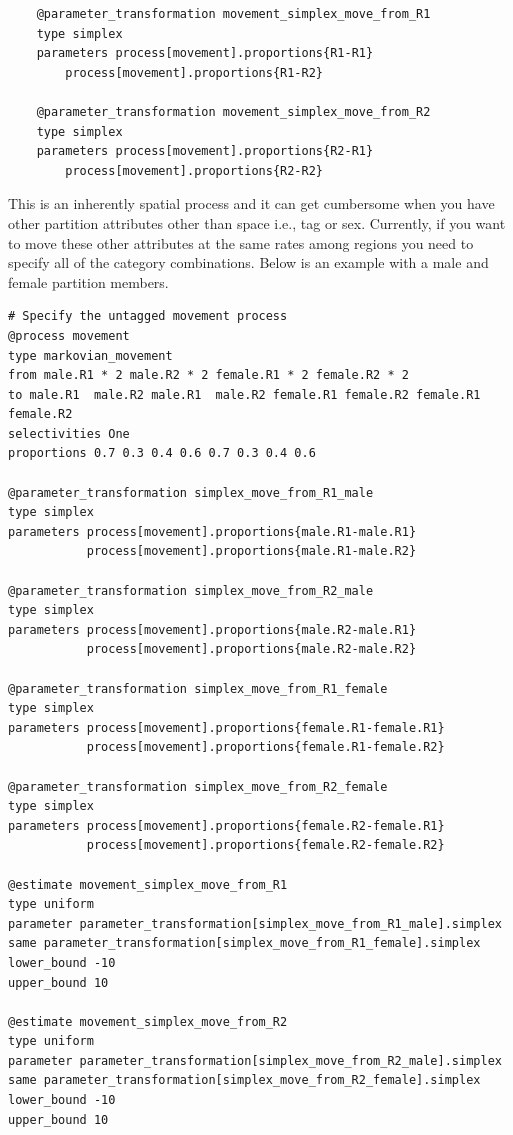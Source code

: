 {\small{\begin{verbatim}
	@parameter_transformation movement_simplex_move_from_R1
	type simplex
	parameters process[movement].proportions{R1-R1} 
		process[movement].proportions{R1-R2}
	
	@parameter_transformation movement_simplex_move_from_R2
	type simplex
	parameters process[movement].proportions{R2-R1} 
		process[movement].proportions{R2-R2}			
\end{verbatim}}}

This is an inherently spatial process and it can get cumbersome when you have other partition attributes other than space i.e., tag or sex. Currently, if you want to move these other attributes at the same rates among regions you need to specify all of the category combinations. Below is an example with a male and female partition members.

{\small{\begin{verbatim}
# Specify the untagged movement process
@process movement
type markovian_movement
from male.R1 * 2 male.R2 * 2 female.R1 * 2 female.R2 * 2
to male.R1  male.R2 male.R1  male.R2 female.R1 female.R2 female.R1  female.R2
selectivities One
proportions 0.7 0.3 0.4 0.6 0.7 0.3 0.4 0.6

@parameter_transformation simplex_move_from_R1_male
type simplex
parameters process[movement].proportions{male.R1-male.R1}
           process[movement].proportions{male.R1-male.R2}

@parameter_transformation simplex_move_from_R2_male
type simplex
parameters process[movement].proportions{male.R2-male.R1}
           process[movement].proportions{male.R2-male.R2}
			
@parameter_transformation simplex_move_from_R1_female
type simplex
parameters process[movement].proportions{female.R1-female.R1} 
           process[movement].proportions{female.R1-female.R2}

@parameter_transformation simplex_move_from_R2_female
type simplex
parameters process[movement].proportions{female.R2-female.R1} 
           process[movement].proportions{female.R2-female.R2}

@estimate movement_simplex_move_from_R1
type uniform
parameter parameter_transformation[simplex_move_from_R1_male].simplex
same parameter_transformation[simplex_move_from_R1_female].simplex
lower_bound -10
upper_bound 10

@estimate movement_simplex_move_from_R2
type uniform
parameter parameter_transformation[simplex_move_from_R2_male].simplex
same parameter_transformation[simplex_move_from_R2_female].simplex
lower_bound -10
upper_bound 10
\end{verbatim}}}


